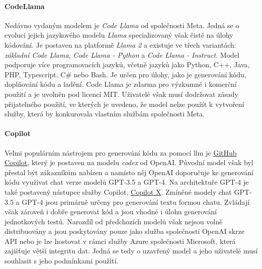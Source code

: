 \documentclass[czech, ma, kiv, he, iso690alph, pdf, viewonly]{fasthesis}
\begin{document}
    \paragraph{CodeLlama} Nedávno vydaným modelem je \textit{Code Llama} od společnosti Meta. Jedná se o evoluci jejich jazykového modelu \textit{Llama} specializovaný však čistě na úlohy kódování. Je postaven na platformě \textit{Llama 2} a existuje ve třech variantách: \textit{základní Code Llama}, \textit{Code Llama - Python} a \textit{Code Llama - Instruct}. Model podporuje více programovacích jazyků, včetně jazyků jako Python, C++, Java, PHP, Typescript, C# nebo Bash. Je určen pro úlohy, jako je generování kódu, doplňování kódu a ladění. Code Llama je zdarma pro výzkumné i komerční použití a je uvolněn pod licencí MIT. Uživatelé však musí dodržovat  zásady přijatelného použití, ve kterých je uvedeno, že model nelze použít k vytvoření služby, která by konkurovala vlastním službám společnosti Meta. 

    \paragraph{Copilot} Velmi populárním nástrojem pro generování kódu za pomocí \gls{llm} je \href{https://github.com/features/copilot}{GitHub Copilot}, který je postaven na modelu \textit{codex} od OpenAI. Původní model však byl přestal být zákazníkům nabízen a namísto něj OpenAI doporučuje ke generování kódu využívat chat verze modelů GPT-3.5 a GPT-4. Na architektuře GPT-4 je také postavený nástupce služby Copilot, \href{https://github.com/features/preview/copilot-x}{Copilot X}. Zmíněné modely chat GPT-3.5 a GPT-4 jsou primárně určeny pro generování textu formou chatu. Zvládají však zároveň i dobře generovat kód a jsou vhodné i úlohu generování jednotkových testů. Narozdíl od předchozích modelů však nejsou volně distribuovány a jsou poskytovány pouze jako služba společností OpenAI skrze API nebo je lze hostovat v rámci služby Azure společnosti Microsoft, která zajišťuje větší integritu dat. Jedná se tedy o uzavřený model a jeho uživatelé musí souhlasit s jeho podmínkami použití.


        \newpage
\end{document}

